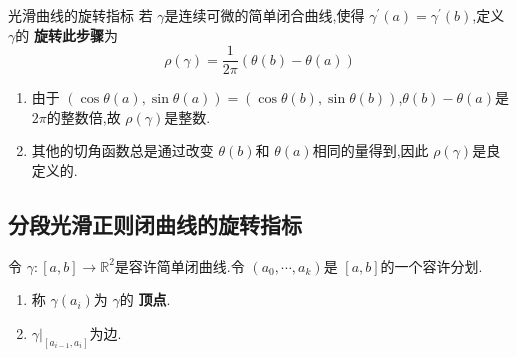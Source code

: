 \documentclass[../../main.tex]{subfiles}
\begin{document}
\begin{definition}{光滑曲线的旋转指标}
    若 \(   \gamma   \)是连续可微的简单闭合曲线,使得 \(   \gamma ^{\prime} \left( a \right)=  \gamma ^{\prime} \left( b \right)    \),定义 \(   \gamma   \)的 \textbf{旋转此步骤}为 \[
    \rho \left(  \gamma  \right)= \frac{1}{2\pi }\left(  \theta \left( b \right)- \theta \left( a \right)   \right)  
    \]   
\end{definition}
\begin{remark}
    \begin{enumerate}
        \item 由于 \(  \left( \cos  \theta \left( a \right),\sin  \theta \left( a \right)   \right)= \left( \cos  \theta \left( b \right),\sin  \theta \left( b \right)   \right)    \),\(   \theta \left( b \right)- \theta \left( a \right)    \)是 \(  2\pi   \)的整数倍,故 \(  \rho \left(  \gamma  \right)   \)是整数.
        \item 其他的切角函数总是通过改变 \(   \theta \left( b \right)   \)和 \(   \theta \left( a \right)   \)相同的量得到,因此 \(  \rho \left(  \gamma  \right)   \)是良定义的.       
    \end{enumerate}
    
\end{remark}

\subsection{分段光滑正则闭曲线的旋转指标}

\begin{definition}
    令 \(   \gamma :\left[ a,b \right]\to \mathbb{R} ^{2}   \)是容许简单闭曲线.令 \(  \left(  a_0,\cdots,a_{k}    \right)   \)是 \(  \left[ a,b \right]   \)的一个容许分划.
    
    \begin{enumerate}
        \item 称  \(   \gamma \left( a_{i} \right)   \)为 \(   \gamma   \)的 \textbf{顶点}.
        \item \(   \gamma |_{\left[ a_{i-1},a_{i} \right] }  \)为边.   
    \end{enumerate}
    
\end{definition}
\end{document}

